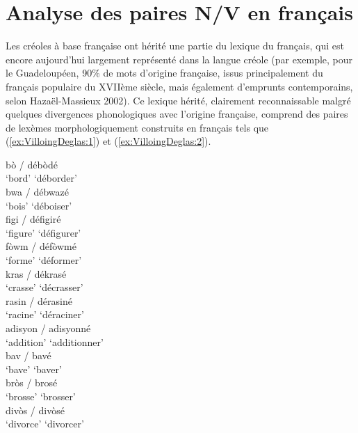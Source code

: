 \documentclass[output=paper]{langsci/langscibook}
\begin{document}
\section{Analyse des paires N/V en
français}\label{section:VilloingDeglas:analyse-des-paires-nv-en-français}

Les créoles à base française ont hérité une partie du lexique du
français, qui est encore aujourd'hui largement représenté dans la langue
créole (par exemple, pour le Guadeloupéen, 90\% de mots d'origine
française, issus principalement du français populaire du XVIIème siècle,
mais également d'emprunts contemporains, selon Hazaël-Massieux 2002). Ce
lexique hérité, clairement reconnaissable malgré quelques divergences
phonologiques avec l'origine française, comprend des paires de lexèmes
morphologiquement construits en français tels que (\ref{ex:VilloingDeglas:1}) et (\ref{ex:VilloingDeglas:2}).

\ea\label{ex:VilloingDeglas:1}
  \ea \gll bò / débòdé\\
  `bord' {} `déborder'\\

  \ex \gll bwa / débwazé\\
  `bois' {} `déboiser'\\

  \ex \gll figi / défigiré\\
  `figure' {} `défigurer'\\

  \ex \gll fòwm / défòwmé\\
  `forme' {} `déformer'\\

  \ex \gll kras / dékrasé\\
  `crasse' {} `décrasser'\\

  \ex \gll rasin / dérasiné\\
  `racine' {} `déraciner'\\
  \z
\ex\label{ex:VilloingDeglas:2}
  \ea \gll adisyon / adisyonné\\
  `addition' {} `additionner'\\

  \ex \gll bav / bavé\\
  `bave' {} `baver'\\

  \ex \gll bròs / brosé\\
  `brosse' {} `brosser'\\

  \ex \gll divòs / divòsé\\
  `divorce' {} `divorcer'\\
\end{document}
